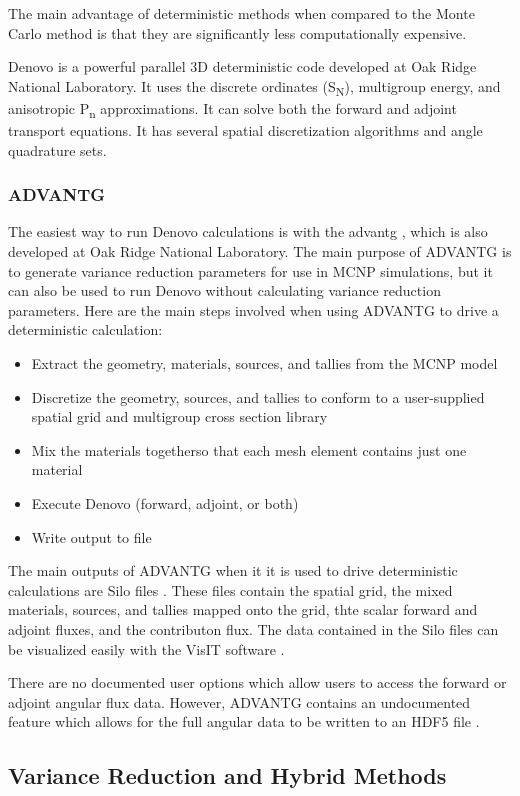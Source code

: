 The main advantage of deterministic methods when compared to the Monte Carlo method is that they are significantly less computationally expensive.

Denovo \cite{denovo} is a powerful parallel 3D deterministic code developed at Oak Ridge National Laboratory.
It uses the discrete ordinates (S\textsubscript{N}), multigroup energy, and anisotropic P\textsubscript{n} approximations.
It can solve both the forward and adjoint transport equations.
It has several spatial discretization algorithms and angle quadrature sets.

\subsubsection{ADVANTG}
\label{sec:bg:rt:determ:advantg}

The easiest way to run Denovo calculations is with the \ac{advantg} \cite{advantg}, which is also developed at Oak Ridge National Laboratory.
The main purpose of ADVANTG is to generate variance reduction parameters for use in MCNP simulations, but it can also be used to run Denovo without calculating variance reduction parameters.
Here are the main steps involved when using ADVANTG to drive a deterministic calculation:

\begin{itemize}
  \item Extract the geometry, materials, sources, and tallies from the MCNP model
  \item Discretize the geometry, sources, and tallies to conform to a user-supplied spatial grid and multigroup cross section library
  \item Mix the materials togetherso that each mesh element contains just one material
  \item Execute Denovo (forward, adjoint, or both)
  \item Write output to file
\end{itemize}

The main outputs of ADVANTG when it it is used to drive deterministic calculations are Silo files \cite{silo}.
These files contain the spatial grid, the mixed materials, sources, and tallies mapped onto the grid, thte scalar forward and adjoint fluxes, and the contributon flux.
The data contained in the Silo files can be visualized easily with the VisIT software \cite{visit}.

There are no documented user options which allow users to access the forward or adjoint angular flux data.
However, ADVANTG contains an undocumented feature which allows for the full angular data to be written to an HDF5 file \cite{hdf5}.

\subsection{Variance Reduction and Hybrid Methods}
\label{sec:bg:rt:vr}
